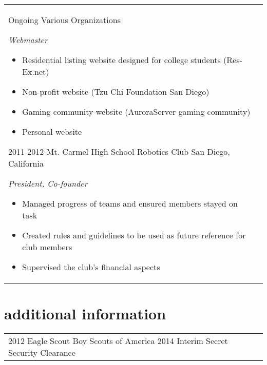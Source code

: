 \documentclass[print]{friggeri-cv} %
\makeatletter
\renewenvironment{entrylist}{%
	\par\begin{tabular*}{\textwidth}{@{\extracolsep{\fill}}ll}
	}{%
\end{tabular*}\par
}
\makeatother
\begin{document}
\begin{entrylist}
\entry
{Ongoing}
{Various Organizations}
{ }
{\emph{Webmaster}
\begin{itemize}
\item Residential listing website designed for college students (Res-Ex.net)
\item Non-profit website (Tzu Chi Foundation San Diego)
\item Gaming community website (AuroraServer gaming community)
\item Personal website
\end{itemize}}
\entry
{2011-2012}
{Mt. Carmel High School Robotics Club}
{San Diego, California}
{\emph{President, Co-founder}
\begin{itemize}
\item Managed progress of teams and ensured members stayed on task
\item Created rules and guidelines to be used as future reference for club members
\item Supervised the club's financial aspects
\end{itemize}}

\end{entrylist}


\section{additional information}

\begin{entrylist}
\entry
{2012}
{Eagle Scout}
{Boy Scouts of America}
{}
\entry
{2014}
{Interim Secret Security Clearance}
{}
{}
\end{entrylist}


\end{document}
